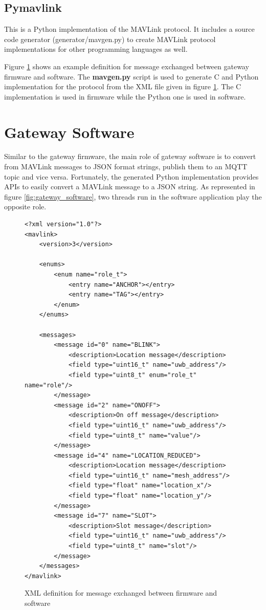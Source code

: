 \documentclass[\main/thesis.tex]{subfiles}
\begin{document}
\subsection{Pymavlink}

This is a Python implementation of the MAVLink protocol. It includes a source code generator (generator/mavgen.py) to create MAVLink protocol implementations for other programming languages as well. 

Figure \ref{net_mesh_mavlink_protocol} shows an example definition for message exchanged between gateway firmware and software. The \textbf{mavgen.py} script is used to generate C and Python implementation for the protocol from the XML file given in figure \ref{net_mesh_mavlink_protocol}. The C implementation is used in firmware while the Python one is used in software.

\section{Gateway Software}
Similar to the gateway firmware, the main role of gateway software is to convert from MAVLink messages to JSON format strings, publish them to an MQTT topic and vice versa. Fortunately, the generated Python implementation provides APIs to easily convert a MAVLink message to a JSON string. As represented in figure \ref{fig:gateway_software}, two threads run in the software application play the opposite role. 

\begin{figure}[H]
    \begin{lstlisting}[style=XMLStyle, emph={messages, message, enums, enum, mavlink}]
<?xml version="1.0"?>
<mavlink>
    <version>3</version>

    <enums>
        <enum name="role_t">
            <entry name="ANCHOR"></entry>
            <entry name="TAG"></entry>
        </enum>
    </enums>

    <messages>
        <message id="0" name="BLINK">
            <description>Location message</description>
            <field type="uint16_t" name="uwb_address"/>
            <field type="uint8_t" enum="role_t" name="role"/>
        </message>
        <message id="2" name="ONOFF">
            <description>On off message</description>
            <field type="uint16_t" name="uwb_address"/>
            <field type="uint8_t" name="value"/>
        </message>
        <message id="4" name="LOCATION_REDUCED">
            <description>Location message</description>
            <field type="uint16_t" name="mesh_address"/>
            <field type="float" name="location_x"/>
            <field type="float" name="location_y"/>
        </message>
        <message id="7" name="SLOT">
            <description>Slot message</description>
            <field type="uint16_t" name="uwb_address"/>
            <field type="uint8_t" name="slot"/>
        </message>
    </messages>
</mavlink>
    \end{lstlisting}
    \caption{XML definition for message exchanged between firmware and software}
    \label{net_mesh_mavlink_protocol}
\end{figure}
\end{document}
